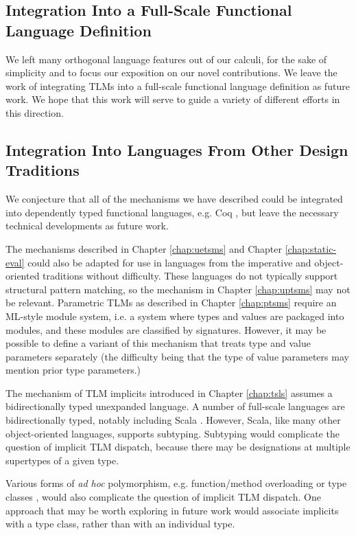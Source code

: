 \vspace{-4px}
\subsection{Integration Into a Full-Scale Functional Language Definition}
We left many orthogonal language features out of our calculi, for the sake of simplicity and to focus our exposition on our novel contributions. We leave the work of integrating TLMs into a full-scale functional language definition as future work. We hope that this work will serve to guide a variety of different efforts in this direction.

\vspace{-4px}
\subsection{Integration Into Languages From Other Design Traditions}
\label{sec:integration}
We conjecture that all of the mechanisms we have described could be integrated into dependently typed functional languages, e.g. Coq \cite{Coq:manual}, but leave the necessary technical developments as future work.

The mechanisms described in Chapter \ref{chap:uetsms} and Chapter \ref{chap:static-eval} could also be adapted for use in languages from the imperative and object-oriented traditions without difficulty. These languages do not typically support structural pattern matching, so the mechanism in Chapter \ref{chap:uptsms} may not be relevant. Parametric TLMs as described in Chapter \ref{chap:ptsms} require an ML-style module system, i.e. a system where types and values are packaged into modules, and these modules are classified by signatures. However, it may be possible to define a variant of this mechanism that treats type and value parameters separately (the difficulty being that the type of value parameters may mention prior type parameters.)

The mechanism of TLM implicits introduced in Chapter \ref{chap:tsls} assumes a bidirectionally typed unexpanded language. A number of full-scale languages are bidirectionally typed, notably including Scala \cite{odersky2008programming}. However, Scala, like many other object-oriented languages, supports subtyping. Subtyping would complicate the question of implicit TLM dispatch, because there may be designations at multiple supertypes of a given type.

Various forms of \emph{ad hoc} polymorphism, e.g. function/method overloading or type classes \cite{Hall:1996:TCH:227699.227700}, would also complicate the question of implicit TLM dispatch. One approach that may be worth exploring in future work would associate implicits with a type class, rather than with an individual type.

